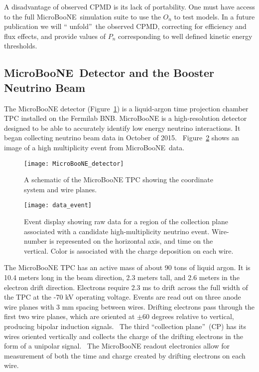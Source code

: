 \documentclass{article}
\begin{document}
A disadvantage of observed CPMD is its lack of portability. One must have
access to the full MicroBooNE\ simulation suite to use the $O_{n}$ to test
models. In a future publication we will \textquotedblleft
unfold\textquotedblright\ the observed CPMD, correcting for efficiency and
flux effects, and provide values of $P_{n}$ corresponding to well defined
kinetic energy thresholds.

\subsection{MicroBooNE\ Detector and the Booster Neutrino Beam}

The MicroBooNE detector (Figure~\ref{img:MicroBooNE picture}) is a
liquid-argon time projection chamber TPC installed on the Fermilab BNB.
MicroBooNE is a high-resolution detector designed to be able to accurately
identify low energy neutrino interactions. It began collecting neutrino beam
data in October of 2015. \ Figure~\ref{img:Event display} shows an image of a high multiplicity event from MicroBooNE\ data.

\begin{figure}[ptb]
\centering
\texttt{[image: MicroBooNE\_detector]} 
\caption{A schematic of the MicroBooNE TPC showing the coordinate
system and wire planes.}
\label{img:MicroBooNE picture}
\end{figure}

\begin{figure}[tbp]
\centering
\texttt{[image: data\_event]} %
\caption{Event display showing raw data for a region of the collection plane
associated with a candidate high-multiplicity neutrino event. Wire-number is
represented on the horizontal axis, and time on the vertical. Color is
associated with the charge deposition on each wire.}
\label{img:Event display}
\end{figure}

The MicroBooNE TPC has an active mass of about 90 tons of liquid argon. It is 10.4 meters long in the beam direction, 2.3 meters tall, and 2.6 meters in the
electron drift direction. Electrons require  2.3 ms  to drift across the
full width of the TPC at the -70 kV operating voltage. Events are read out
on three anode wire planes with 3 mm spacing between wires. Drifting
electrons pass through the first two wire planes, which are oriented at $\pm
60$ degrees relative to vertical, producing bipolar induction signals. \ The
third \textquotedblleft collection plane\textquotedblright\ (CP) has its
wires oriented vertically and collects the charge of the drifting electrons
in the form of a unipolar signal. \ The MicroBooNE readout electronics
allow for measurement of both the time and charge created by drifting
electrons on each wire.
\end{document}
